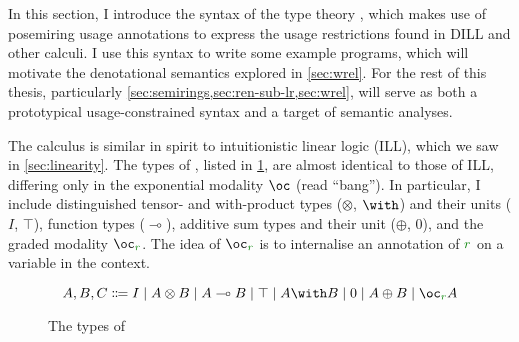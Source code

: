 In this section, I introduce the syntax of the type theory \name{}, which makes
use of posemiring usage annotations to express the usage restrictions found in
DILL and other calculi.
I use this syntax to write some example programs, which will motivate the
denotational semantics explored in \cref{sec:wrel}.
For the rest of this thesis, particularly
\cref{sec:semirings,sec:ren-sub-lr,sec:wrel},
\name{} will serve as both a prototypical
usage-constrained syntax and a target of semantic analyses.

The calculus \name{} is similar in spirit to intuitionistic linear logic (ILL),
which we saw in \cref{sec:linearity}.
The types of \name{}, listed in \cref{fig:lr-types}, are almost identical
to those of ILL, differing only in the exponential modality $\oc$
(read ``bang'').
In particular, I include distinguished tensor- and with-product types
($\otimes$, $\with$) and their units ($I$, $\top$), function types
($\multimap$), additive sum types and their unit ($\oplus$, $0$), and the
graded modality $\oc_{\gr r}$.
The idea of $\oc_{\gr r}$ is to internalise an annotation of $\gr r$ on a
variable in the context.

\begin{figure}
  \begin{displaymath}
    A, B, C \Coloneqq I \mid A \otimes B \mid A \multimap B \mid \top
    \mid A \with B \mid 0 \mid A \oplus B \mid \oc_{\gr r} A
  \end{displaymath}
  \caption{The types of \name{}}
  \label{fig:lr-types}
\end{figure}

